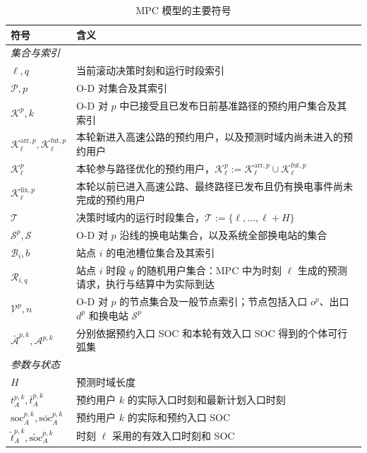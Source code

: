 \documentclass[12pt,a4paper,UTF8]{ctexart}
\begin{document}
\begin{table}[!htbp]
  \centering
  \caption{MPC 模型的主要符号}
  \label{tab:notation}
  \scriptsize
  \setlength{\tabcolsep}{2pt}
  \renewcommand{\arraystretch}{0.88}
  \begin{tabular}{@{}lp{13cm}@{}}
    \toprule
    \textbf{符号} & \textbf{含义} \\
    \midrule
    \multicolumn{2}{l}{\textit{集合与索引}} \\
    $\ell,q$ & 当前滚动决策时刻和运行时段索引 \\
    $\mathcal{P},p$ & O-D 对集合及其索引 \\
    $\mathcal{K}^{p},k$ & O-D 对 $p$ 中已接受且已发布日前基准路径的预约用户集合及其索引 \\
    $\mathcal{K}_{\ell}^{\mathrm{arr},p},\mathcal{K}_{\ell}^{\mathrm{fut},p}$ & 本轮新进入高速公路的预约用户，以及预测时域内尚未进入的预约用户 \\
    $\mathcal{K}_{\ell}^{p}$ & 本轮参与路径优化的预约用户，$\mathcal{K}_{\ell}^{p}:=\mathcal{K}_{\ell}^{\mathrm{arr},p}\cup\mathcal{K}_{\ell}^{\mathrm{fut},p}$ \\
    $\mathcal{K}_{\ell}^{\mathrm{fix},p}$ & 本轮以前已进入高速公路、最终路径已发布且仍有换电事件尚未完成的预约用户 \\
    $\mathcal{T}$ & 决策时域内的运行时段集合，$\mathcal{T}:=\{\ell,\ldots,\ell+H\}$ \\
    $\mathcal{S}^{p},\mathcal{S}$ & O-D 对 $p$ 沿线的换电站集合，以及系统全部换电站的集合 \\
    $\mathcal{B}_{i},b$ & 站点 $i$ 的电池槽位集合及其索引 \\
    $\mathcal R_{i,q}$ & 站点 $i$ 时段 $q$ 的随机用户集合：MPC 中为时刻 $\ell$ 生成的预测请求，执行与结算中为实际到达 \\
    $\mathcal{V}^{p},n$ & O-D 对 $p$ 的节点集合及一般节点索引；节点包括入口 $o^p$、出口 $d^p$ 和换电站 $\mathcal S^p$ \\
    $\bar{\mathcal A}^{p,k},\mathcal A^{p,k}$ & 分别依据预约入口 SOC 和本轮有效入口 SOC 得到的个体可行弧集 \\
    \midrule
    \multicolumn{2}{l}{\textit{参数与状态}} \\
    $H$ & 预测时域长度 \\
    $t_A^{p,k},\bar t_A^{p,k}$ & 预约用户 $k$ 的实际入口时刻和最新计划入口时刻 \\
    $\mathrm{soc}_A^{p,k},\overline{\mathrm{soc}}_A^{p,k}$ & 预约用户 $k$ 的实际和预约入口 SOC \\
    $\widetilde t_{A}^{p,k},\widetilde{\mathrm{soc}}_{A}^{p,k}$ & 时刻 $\ell$ 采用的有效入口时刻和 SOC \\

\end{tabular}
\end{table}
\end{document}
